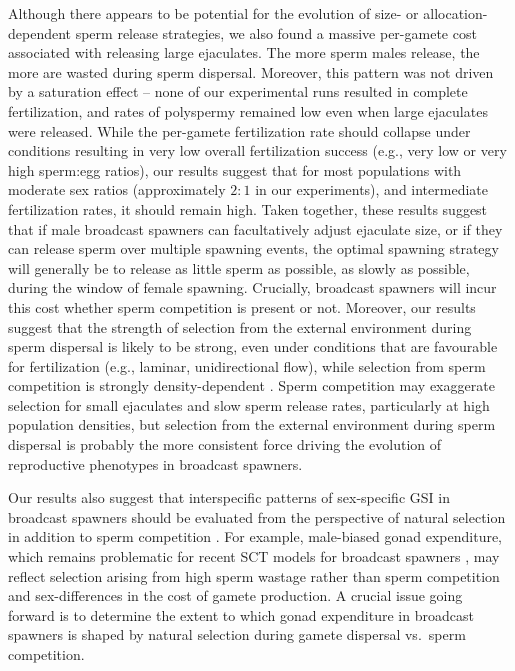 \documentclass{article}
\begin{document}
Although there appears to be potential for the evolution of size- or allocation-dependent sperm release strategies, we also found a massive per-gamete cost associated with releasing large ejaculates. The more sperm males release, the more are wasted during sperm dispersal. Moreover, this pattern was not driven by a saturation effect -- none of our experimental runs resulted in complete fertilization, and rates of polyspermy remained low even when large ejaculates were released. While the per-gamete fertilization rate should collapse under conditions resulting in very low overall fertilization success (e.g., very low or very high sperm:egg ratios), our results suggest that for most populations with moderate sex ratios (approximately $2:1$ in our experiments), and intermediate fertilization rates, it should remain high. Taken together, these results suggest that if male broadcast spawners can facultatively adjust ejaculate size, or if they can release sperm over multiple spawning events, the optimal spawning strategy will generally be to release as little sperm as possible, as slowly as possible, during the window of female spawning. Crucially, broadcast spawners will incur this cost whether sperm competition is present or not. Moreover, our results suggest that the strength of selection from the external environment during sperm dispersal is likely to be strong, even under conditions that are favourable for fertilization (e.g., laminar, unidirectional flow), while selection from sperm competition is strongly density-dependent \citep{Parker1982,Levitan1998,BodeMarshall2007,Parker2017}. Sperm competition may exaggerate selection for small ejaculates and slow sperm release rates, particularly at high population densities, but selection from the external environment during sperm dispersal is probably the more consistent force driving the evolution of reproductive phenotypes in broadcast spawners. 

Our results also suggest that interspecific patterns of sex-specific GSI in broadcast spawners should be evaluated from the perspective of natural selection in addition to sperm competition \citep{Parker2017}. For example, male-biased gonad expenditure, which remains problematic for recent SCT models for broadcast spawners \citep{Parker2017}, may reflect selection arising from high sperm wastage rather than sperm competition and sex-differences in the cost of gamete production. A crucial issue going forward is to determine the extent to which gonad expenditure in broadcast spawners is shaped by natural selection during gamete dispersal vs.~sperm competition. 
\end{document}
